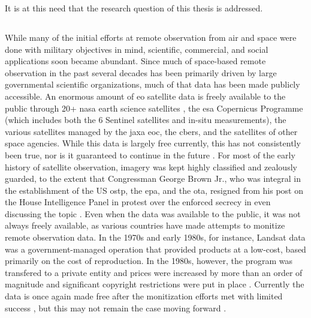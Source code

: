 It is at this need that the research question of this thesis is addressed.


\subsection{} \label{sec:remote}


While many of the initial efforts at remote observation from air and space were done with military objectives in mind, scientific, commercial, and social applications soon became abundant. Since much of space-based remote observation in the past several decades has been primarily driven by large governmental scientific organizations, much of that data has been made publicly accessible. An enormous amount of \ac{eo} satellite data is freely available to the public through 20+ \ac{nasa} earth science satellites \cite{shirahNASAEarthObserving2017}, the \ac{esa} Copernicus Programme (which includes both the 6 Sentinel satellites and in-situ measurements), the various satellites managed by the \ac{jaxa} \ac{eoc}, the \ac{cbers}, and the satellites of other space agencies. While this data is largely free currently, this has not consistently been true, nor is it guaranteed to continue in the future \cite{borowitzOpenSpaceGlobal2017}. For most of the early history of satellite observation, imagery was kept highly classified and zealously guarded, to the extent that Congressman George Brown Jr., who was integral in the establishment of the US \ac{ostp}, the \ac{epa}, and the \ac{ota}, resigned from his post on the House Intelligence Panel in protest over the enforced secrecy in even discussing the topic \cite{healyRepBrownQuits1987, barry1992mappings}. Even when the data was available to the public, it was not always freely available, as various countries have made attempts to monitize remote observation data. In the 1970s and early 1980s, for instance, Landsat data was a government-managed operation that provided products at a low-cost, based primarily on the cost of reproduction. In the 1980s, however, the program was transfered to a private entity and prices were increased by more than an order of magnitude and significant copyright restrictions were put in place \cite{mchaffieManufacturingMetaphors1994}. Currently the data is once again made free after the monitization efforts met with limited success \cite{waldropLandsatCommercializationStumbles1987}, but this may not remain the case moving forward \cite{popkinUSGovernmentConsiders2018}.

